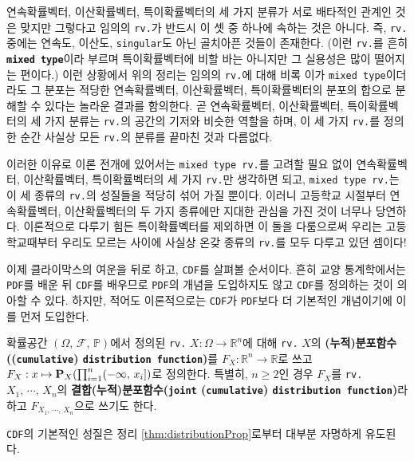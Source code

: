 연속확률벡터, 이산확률벡터, 특이확률벡터의 세 가지 분류가 서로 배타적인 관계인 것은 맞지만 그렇다고 임의의 \texttt{rv.}가 반드시 이 셋 중 하나에 속하는 것은 아니다. 즉, \texttt{rv.} 중에는 연속도, 이산도, \texttt{singular}도 아닌 골치아픈 것들이 존재한다. (이런 \texttt{rv.}를 흔히 \textbf{\texttt{mixed type}}이라 부르며 특이확률벡터에 비할 바는 아니지만 그 실용성은 많이 떨어지는 편이다.) 이런 상황에서 위의 정리는 임의의 \texttt{rv.}에 대해 비록 이가 \texttt{mixed type}이더라도 그 분포는 적당한 연속확률벡터, 이산확률벡터, 특이확률벡터의 분포의 합으로 분해할 수 있다는 놀라운 결과를 함의한다. 곧 연속확률벡터, 이산확률벡터, 특이확률벡터의 세 가지 분류는 \texttt{rv.}의 공간의 기저와 비슷한 역할을 하며, 이 세 가지 \texttt{rv.}를 정의한 순간 사실상 모든 \texttt{rv.}의 분류를 끝마친 것과 다름없다.

이러한 이유로 이론 전개에 있어서는 \texttt{mixed type rv.}를 고려할 필요 없이 연속확률벡터, 이산확률벡터, 특이확률벡터의 세 가지 \texttt{rv.}만 생각하면 되고, \texttt{mixed type rv.}는 이 세 종류의 \texttt{rv.}의 성질들을 적당히 섞어 가질 뿐이다. 이러니 고등학교 시절부터 연속확률벡터, 이산확률벡터의 두 가지 종류에만 지대한 관심을 가진 것이 너무나 당연하다. 이론적으로 다루기 힘든 특이확률벡터를 제외하면 이 둘을 다룸으로써 우리는 고등학교때부터 우리도 모르는 사이에 사실상 온갖 종류의 \texttt{rv.}를 모두 다루고 있던 셈이다!

이제 클라이막스의 여운을 뒤로 하고, \texttt{CDF}를 살펴볼 순서이다. 흔히 교양 통계학에서는 \texttt{PDF}를 배운 뒤 \texttt{CDF}를 배우므로 \texttt{PDF}의 개념을 도입하지도 않고 \texttt{CDF}를 정의하는 것이 의아할 수 있다. 하지만, 적어도 이론적으로는 \texttt{CDF}가 \texttt{PDF}보다 더 기본적인 개념이기에 이를 먼저 도입한다.

\begin{definition}
    확률공간 $(\Omega,\,\mathcal{F},\,\mathbb{P})$에서 정의된 \texttt{rv.} $X:\Omega\to\mathbb{R}^n$에 대해 \texttt{rv.} $X$의 \textbf{(누적)분포함수((\texttt{cumulative}) \texttt{distribution function})}를 $F_X:\mathbb{R}^n\to\mathbb{R}$로 쓰고 $F_X:x\mapsto\mathbf{P}_X(\prod_{i=1}^n(-\infty,\,x_i])$로 정의한다. 특별히, $n\geq2$인 경우 $F_X$를 \texttt{rv.} $X_1,\,\cdots,\,X_n$의 \textbf{결합(누적)분포함수(\texttt{joint} (\texttt{cumulative}) \texttt{distribution function})}라 하고 $F_{X_1,\,\cdots,\,X_n}$으로 쓰기도 한다.
\end{definition}

\texttt{CDF}의 기본적인 성질은 정리 \ref{thm:distributionProp}로부터 대부분 자명하게 유도된다.

